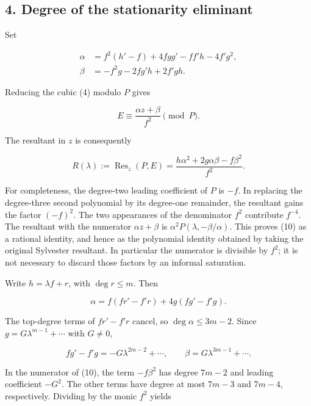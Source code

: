 \documentclass[10pt,a4paper]{article}
\begin{document}

\subsection{4. Degree of the stationarity
eliminant}\label{degree-of-the-stationarity-eliminant}

Set

\nopagebreak[4]

\[\begin{aligned}
\alpha&=f^2(h'-f)+4fgg'-ff'h-4f'g^2,\\
\beta&=-f^2g-2fg'h+2f'gh.
\end{aligned}\tag{8}\]

Reducing the cubic (4) modulo \(P\) gives

\nopagebreak[4]

\[E\equiv\frac{\alpha z+\beta}{f^2}\pmod P.\tag{9}\]

The resultant in \(z\) is consequently

\nopagebreak[4]

\[R(\lambda):=\operatorname{Res}_z(P,E)
=\frac{h\alpha^2+2g\alpha\beta-f\beta^2}{f^2}.\tag{10}\]

For completeness, the degree-two leading coefficient of \(P\) is \(-f\).
In replacing the degree-three second polynomial by its degree-one
remainder, the resultant gains the factor \((-f)^2\). The two
appearances of the denominator \(f^2\) contribute \(f^{-4}\). The
resultant with the numerator \(\alpha z+\beta\) is
\(\alpha^2P(\lambda,-\beta/\alpha)\). This proves (10) as a rational
identity, and hence as the polynomial identity obtained by taking the
original Sylvester resultant. In particular the numerator is divisible
by \(f^2\); it is not necessary to discard those factors by an informal
saturation.

Write \(h=\lambda f+r\), with \(\deg r\le m\). Then

\nopagebreak[4]

\[\alpha=f(fr'-f'r)+4g(fg'-f'g).\]

The top-degree terms of \(fr'-f'r\) cancel, so \(\deg\alpha\le3m-2\).
Since \(g=G\lambda^{m-1}+\cdots\) with \(G\ne0\),

\nopagebreak[4]

\[fg'-f'g=-G\lambda^{2m-2}+\cdots,\qquad
\beta=G\lambda^{3m-1}+\cdots.\]

In the numerator of (10), the term \(-f\beta^2\) has degree \(7m-2\) and
leading coefficient \(-G^2\). The other terms have degree at most
\(7m-3\) and \(7m-4\), respectively. Dividing by the monic \(f^2\)
yields
\end{document}
